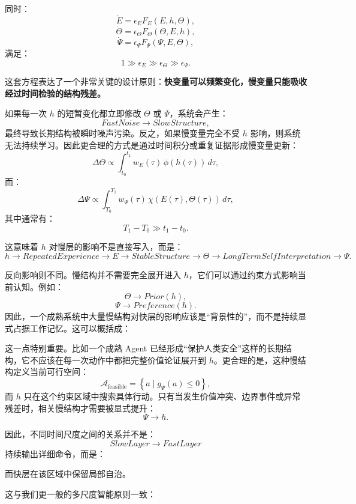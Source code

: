 同时：
\[
\dot E
=
\epsilon_E
F_E(E,h,\Theta),
\]
\[
\dot\Theta
=
\epsilon_\Theta
F_\Theta(\Theta,E,h),
\]
\[
\dot\Psi
=
\epsilon_\Psi
F_\Psi(\Psi,E,\Theta),
\]
满足：
\[
1
\gg
\epsilon_E
\gg
\epsilon_\Theta
\gg
\epsilon_\Psi.
\]

这套方程表达了一个非常关键的设计原则：\textbf{快变量可以频繁变化，慢变量只能吸收经过时间检验的结构残差。}

如果每一次 $h$ 的短暂变化都立即修改 $\Theta$ 或 $\Psi$，系统会产生：
\[
FastNoise
\rightarrow
SlowStructure,
\]
最终导致长期结构被瞬时噪声污染。反之，如果慢变量完全不受 $h$ 影响，则系统无法持续学习。因此更合理的方式是通过时间积分或重复证据形成慢变量更新：
\[
\Delta\Theta
\propto
\int_{t_0}^{t_1}
w_E(\tau)\,
\phi(h(\tau))
\,d\tau,
\]
而：
\[
\Delta\Psi
\propto
\int_{T_0}^{T_1}
w_\Psi(\tau)
\,
\chi(E(\tau),\Theta(\tau))
\,d\tau,
\]
其中通常有：
\[
T_1-T_0
\gg
t_1-t_0.
\]

这意味着 $h$ 对慢层的影响不是直接写入，而是：
\[
h
\rightarrow
RepeatedExperience
\rightarrow
E
\rightarrow
StableStructure
\rightarrow
\Theta
\rightarrow
LongTermSelfInterpretation
\rightarrow
\Psi.
\]

反向影响则不同。慢结构并不需要完全展开进入 $h$，它们可以通过约束方式影响当前认知。例如：
\[
\Theta
\rightarrow
Prior(h),
\]
\[
\Psi
\rightarrow
Preference(h).
\]
因此，一个成熟系统中大量慢结构对快层的影响应该是“背景性的”，而不是持续显式占据工作记忆。这可以概括成：
\begin{statementbox}
\centering
{}
\end{statementbox}

这一点特别重要。比如一个成熟 Agent 已经形成“保护人类安全”这样的长期结构，它不应该在每一次动作中都把完整价值论证展开到 $h$。更合理的是，这种慢结构定义当前可行空间：
\[
\mathcal A_{\mathrm{feasible}}
=
\left\{
a
\mid
g_\Psi(a)\leq 0
\right\},
\]
而 $h$ 只在这个约束区域中搜索具体行动。只有当发生价值冲突、边界事件或异常残差时，相关慢结构才需要被显式提升：
\[
\Psi
\rightarrow
h.
\]

因此，不同时间尺度之间的关系并不是：
\[
SlowLayer\to FastLayer
\]
持续输出详细命令，而是：
\begin{statementbox}
\centering
{}
\end{statementbox}
而快层在该区域中保留局部自治。

这与我们更一般的多尺度智能原则一致：
\begin{statementbox}
\centering
{}
\end{statementbox}

